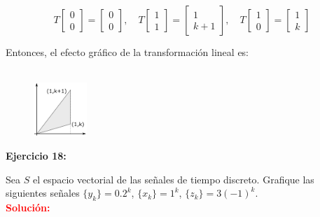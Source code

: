 \documentclass[12pt]{article}
\begin{document}
\begin{enumerate}[label=(\alph*)]
\begin{equation}
    T \begin{bmatrix}
        0 \\ 
        0
    \end{bmatrix} = \begin{bmatrix}
                        0 \\ 
                        0
                    \end{bmatrix} 
    ,\quad
    T \begin{bmatrix}
        1 \\ 
        1
    \end{bmatrix} = \begin{bmatrix}
                         1 \\ 
                        k+1
                    \end{bmatrix}
    ,\quad
    T \begin{bmatrix}
        1 \\ 
        0
    \end{bmatrix} = \begin{bmatrix}
                        1 \\ 
                        k
                    \end{bmatrix}
\end{equation}

Entonces, el efecto gráfico de la transformación lineal es:\\ \\

\begin{figure}[htbp]
    \centering
    \includegraphics[width=0.18\textwidth]{17d.png}
\end{figure}

\end{enumerate}



%
\noindent \textbf{Ejercicio 18:}

Sea $S$ el espacio vectorial de las señales de tiempo discreto. Grafique las siguientes señales $\{y_{k}\}=0.2^{k}$, $\{x_{k}\}=1^{k}$, $\{z_{k}\}=3(-1)^{k}$.\\

\noindent \textcolor{red}{\bf Solución:}\\
\end{document}
